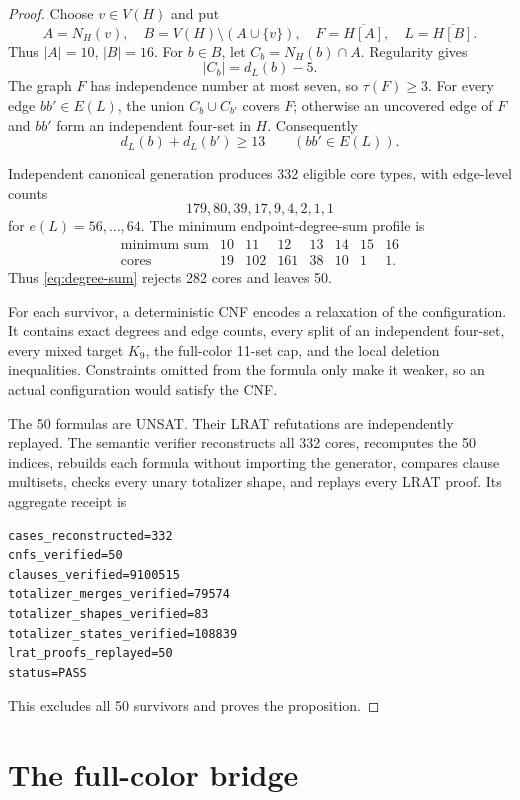 \documentclass[11pt,reqno,a4paper]{amsart}
\theoremstyle{definition}
\theoremstyle{remark}
\newcommand{\comp}[1]{\overline{#1}}
\begin{document}
\begin{proof}
Choose $v\in V(H)$ and put
\[
 A=N_H(v),\quad B=V(H)\setminus(A\cup\{v\}),\quad
 F=\comp{H[A]},\quad L=\comp{H[B]}.
\]
Thus $|A|=10$, $|B|=16$. For $b\in B$, let
$C_b=N_H(b)\cap A$. Regularity gives
\begin{equation}\label{eq:column-size}
 |C_b|=d_L(b)-5.
\end{equation}
The graph $F$ has independence number at most seven, so
$\tau(F)\ge3$. For every edge $bb'\in E(L)$, the union
$C_b\cup C_{b'}$ covers $F$; otherwise an uncovered edge of $F$ and
$bb'$ form an independent four-set in $H$. Consequently
\begin{equation}\label{eq:degree-sum}
 d_L(b)+d_L(b')\ge13\qquad(bb'\in E(L)).
\end{equation}

Independent canonical generation produces 332 eligible core types, with
edge-level counts
\[
179,80,39,17,9,4,2,1,1
\]
for $e(L)=56,\ldots,64$. The minimum endpoint-degree-sum profile is
\[
\begin{array}{c|rrrrrrr}
\text{minimum sum}&10&11&12&13&14&15&16\\ \hline
\text{cores}&19&102&161&38&10&1&1.
\end{array}
\]
Thus \eqref{eq:degree-sum} rejects 282 cores and leaves 50.

For each survivor, a deterministic CNF encodes a relaxation of the
configuration. It contains exact degrees and edge counts, every split of
an independent four-set, every mixed target $K_9$, the full-color
11-set cap, and the local deletion inequalities. Constraints omitted
from the formula only make it weaker, so an actual configuration would
satisfy the CNF.

The 50 formulas are UNSAT. Their LRAT refutations are independently
replayed. The semantic verifier reconstructs all 332 cores, recomputes the
50 indices, rebuilds each formula without importing the generator, compares
clause multisets, checks every unary totalizer shape, and replays every
LRAT proof. Its aggregate receipt is
\begin{verbatim}
cases_reconstructed=332
cnfs_verified=50
clauses_verified=9100515
totalizer_merges_verified=79574
totalizer_shapes_verified=83
totalizer_states_verified=108839
lrat_proofs_replayed=50
status=PASS
\end{verbatim}
This excludes all 50 survivors and proves the proposition.
\end{proof}

\section{The full-color bridge}\label{sec:bridge}
\end{document}
